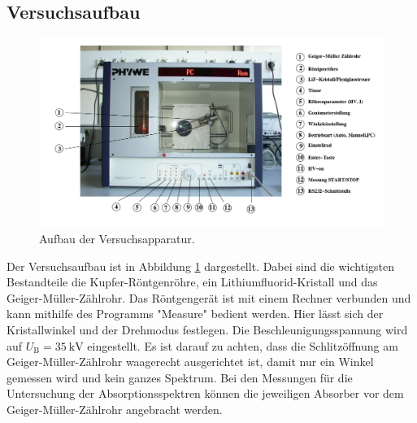 \subsection{Versuchsaufbau}
\label{sec:Versuchsaufbau}
\begin{figure}
	\includegraphics[width=1.0\textwidth]{nIKO_und_jULIAN_ÜLADS/aufbau.png}
	\caption{Aufbau der Versuchsapparatur. \cite{Anleitung}}
	\label{fig:aufbau}
\end{figure}

Der Versuchsaufbau ist in Abbildung \ref{fig:aufbau} dargestellt.
Dabei sind die wichtigsten Bestandteile die Kupfer-Röntgenröhre, ein Lithiumfluorid-Kristall
und das Geiger-Müller-Zählrohr.
Das Röntgengerät ist mit einem Rechner verbunden und kann mithilfe des Programms "Measure"
bedient werden.
Hier lässt sich der Kristallwinkel und der Drehmodus festlegen.
Die Beschleunigungsspannung wird auf $U_{\mathrm{B}}=\SI{35}{\kilo\volt}$ eingestellt.
Es ist darauf zu achten, dass die Schlitzöffnung am Geiger-Müller-Zählrohr waagerecht
ausgerichtet ist, damit nur ein Winkel gemessen wird und kein ganzes Spektrum.
Bei den Messungen für die Untersuchung der Absorptionsspektren können die jeweiligen Absorber
vor dem Geiger-Müller-Zählrohr angebracht werden.
